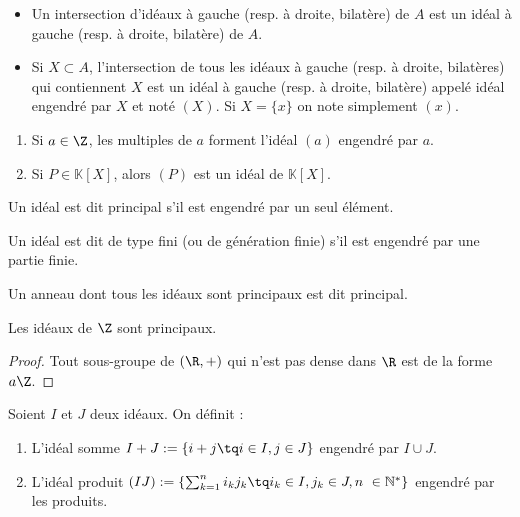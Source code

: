 \begin{defiprop}
 \begin{itemize}
  \item Un intersection d'idéaux à gauche (resp. à droite, bilatère) de $A$ est
un idéal à gauche (resp. à droite, bilatère) de $A$.
 \item Si $X \subset A$, l'intersection de tous les idéaux à gauche (resp. à
droite, bilatères) qui contiennent $X$ est un idéal à gauche (resp. à droite,
bilatère) appelé idéal engendré par $X$ et noté $(X)$. Si $X=\{x\}$ on note
simplement $(x)$.
 \end{itemize}
\end{defiprop}

\begin{example}[Exemples]
 \begin{enumerate}
  \item Si $a\in \Z$, les multiples de $a$ forment l'idéal $(a)$ engendré
par $a$.
  \item Si $P\in \mathbb{K}[X]$, alors $(P)$ est un idéal de $\mathbb{K}[X]$.
 \end{enumerate}
\end{example}

\begin{defi}
  

 Un idéal est dit principal s'il est engendré par un seul élément.

 Un idéal est dit de type fini (ou de génération finie) s'il est engendré par
une partie finie.

 Un anneau dont tous les idéaux sont principaux est dit principal.
\end{defi}

\begin{prop}

 Les idéaux de $\Z$ sont principaux.
\end{prop}

\begin{proof}

 Tout sous-groupe de $(\R,+)$ qui n'est pas dense dans $\R$ est de la forme
$a\Z$.
\end{proof}


\begin{defi}
 

 Soient $I$ et $J$ deux idéaux. On définit :
\begin{enumerate}
 \item L'idéal somme $I + J := \{i + j \tq i\in I, j
\in J\}$ engendré par $I\cup J$.
 \item L'idéal produit $(IJ) := \left\{\sum_{k=1}^{n}i_kj_k \tq i_k \in I, j_k
\in J, n \in \mathbb{N}^* \right\}  $ engendré par les produits. 
\end{enumerate}
\end{defi}

